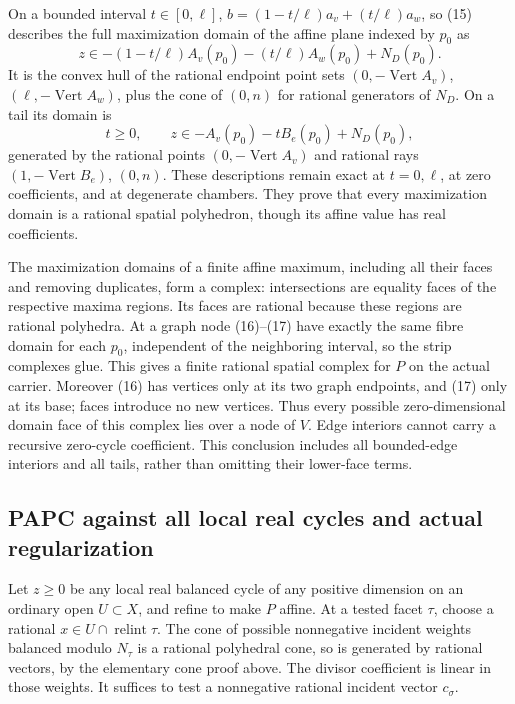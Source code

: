 \documentclass[
  11pt,
]{article}
\begin{document}
On a bounded interval \(t\in[0,\ell]\), \(b=(1-t/\ell)a_v+(t/\ell)a_w\),
so (15) describes the full maximization domain of the affine plane
indexed by \(p_0\) as \[
 z\in-(1-t/\ell)A_v(p_0)-(t/\ell)A_w(p_0)+N_D(p_0).                       \tag{16}
\] It is the convex hull of the rational endpoint point sets
\((0,-\operatorname{Vert}A_v)\), \((\ell,-\operatorname{Vert}A_w)\),
plus the cone of \((0,n)\) for rational generators of \(N_D\). On a tail
its domain is \[
 t\geq0,\qquad z\in-A_v(p_0)-tB_e(p_0)+N_D(p_0),                         \tag{17}
\] generated by the rational points \((0,-\operatorname{Vert}A_v)\) and
rational rays \((1,-\operatorname{Vert}B_e)\), \((0,n)\). These
descriptions remain exact at \(t=0,\ell\), at zero coefficients, and at
degenerate chambers. They prove that every maximization domain is a
rational spatial polyhedron, though its affine value has real
coefficients.

The maximization domains of a finite affine maximum, including all their
faces and removing duplicates, form a complex: intersections are
equality faces of the respective maxima regions. Its faces are rational
because these regions are rational polyhedra. At a graph node (16)--(17)
have exactly the same fibre domain for each \(p_0\), independent of the
neighboring interval, so the strip complexes glue. This gives a finite
rational spatial complex for \(P\) on the actual carrier. Moreover (16)
has vertices only at its two graph endpoints, and (17) only at its base;
faces introduce no new vertices. Thus every possible zero-dimensional
domain face of this complex lies over a node of \(V\). Edge interiors
cannot carry a recursive zero-cycle coefficient. This conclusion
includes all bounded-edge interiors and all tails, rather than omitting
their lower-face terms.

\subsection{PAPC against all local real cycles and actual
regularization}\label{papc-against-all-local-real-cycles-and-actual-regularization}

Let \(z\geq0\) be any local real balanced cycle of any positive
dimension on an ordinary open \(U\subset X\), and refine to make \(P\)
affine. At a tested facet \(\tau\), choose a rational
\(x\in U\cap\operatorname{relint}\tau\). The cone of possible
nonnegative incident weights balanced modulo \(N_\tau\) is a rational
polyhedral cone, so is generated by rational vectors, by the elementary
cone proof above. The divisor coefficient is linear in those weights. It
suffices to test a nonnegative rational incident vector \(c_\sigma\).
\end{document}
